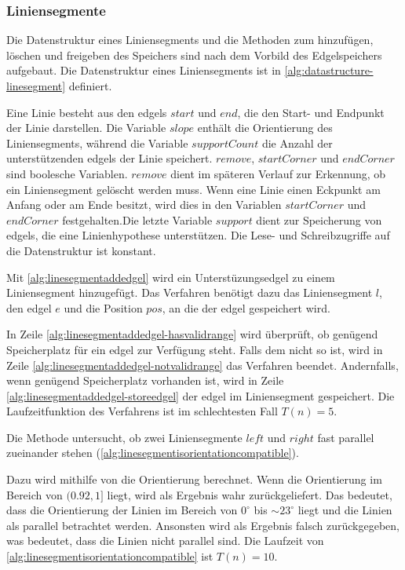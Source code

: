 \subsubsection{Liniensegmente} %
\label{sub:datenstruktur-liniensegmente}

Die Datenstruktur eines Liniensegments und die Methoden zum hinzufügen, löschen und freigeben des Speichers sind nach
 dem Vorbild des Edgelspeichers aufgebaut. Die Datenstruktur eines Liniensegments ist in
 \autoref{alg:datastructure-linesegment} definiert.

Eine Linie besteht aus den \glspl{edgel} $\mathit{start}$ und $\mathit{end}$, die den Start- und Endpunkt der Linie
 darstellen. Die Variable $\mathit{slope}$ enthält die Orientierung des Liniensegments, während die Variable
 $\mathit{supportCount}$ die Anzahl der unterstützenden \glspl{edgel} der Linie speichert. $\mathit{remove}$,
 $\mathit{startCorner}$ und $\mathit{endCorner}$ sind boolesche Variablen. $\mathit{remove}$ dient im späteren Verlauf
 zur Erkennung, ob ein Liniensegment gelöscht werden muss. Wenn eine Linie einen Eckpunkt am Anfang oder am Ende
 besitzt, wird dies in den Variablen $\mathit{startCorner}$ und $\mathit{endCorner}$ festgehalten.Die letzte Variable
 $\mathit{support}$ dient zur Speicherung von \glspl{edgel}, die eine Linienhypothese unterstützen. Die Lese- und
 Schreibzugriffe auf die Datenstruktur ist konstant.

Mit \autoref{alg:linesegmentaddedgel} wird ein Unterstüzungsedgel zu einem Liniensegment hinzugefügt. Das Verfahren
 benötigt dazu das Liniensegment $l$, den \gls{edgel} $e$ und die Position $\mathit{pos}$, an die der \gls{edgel}
 gespeichert wird.

In Zeile \ref{alg:linesegmentaddedgel-hasvalidrange} wird überprüft, ob genügend Speicherplatz für ein \gls{edgel} zur
 Verfügung steht. Falls dem nicht so ist, wird in Zeile \ref{alg:linesegmentaddedgel-notvalidrange} das Verfahren
 beendet. Andernfalls, wenn genügend Speicherplatz vorhanden ist, wird in Zeile
 \ref{alg:linesegmentaddedgel-storeedgel} der \gls{edgel} im Liniensegment gespeichert. Die Laufzeitfunktion des
 Verfahrens ist im schlechtesten Fall $T(n) = 5$.

Die Methode  untersucht, ob zwei Liniensegmente $\mathit{left}$ und $\mathit{right}$
 fast parallel zueinander stehen (\autoref{alg:linesegmentisorientationcompatible}).

Dazu wird mithilfe von  die Orientierung berechnet. Wenn die Orientierung im Bereich von
 $(0.92,1]$ liegt, wird als Ergebnis wahr zurückgeliefert. Das bedeutet, dass die Orientierung der Linien im Bereich
 von $0^\circ$ bis $\sim 23^\circ$ liegt und die Linien als parallel betrachtet werden. Ansonsten wird als Ergebnis
 falsch zurückgegeben, was bedeutet, dass die Linien nicht parallel sind. Die Laufzeit von
 \autoref{alg:linesegmentisorientationcompatible} ist $T(n) = 10$.

